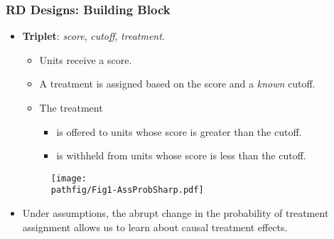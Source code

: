 \documentclass[9pt]{beamer}
\newcommand{\pathfig}{figures}
\begin{document}
\begin{frame}\frametitle{RD Designs: Building Block}
	\begin{itemize}
		\item \textbf{Triplet}: \textit{score}, \textit{cutoff}, \textit{treatment}.\medskip 
		\begin{itemize}
			\item Units receive a score.\medskip 
			
			\item A treatment is assigned based on the score and a \textit{known} cutoff.\medskip
			
			\item The treatment\smallskip
			\begin{itemize}
				\item[] is offered to units whose score is greater than the cutoff.\smallskip 
				\item[] is withheld from units whose score is less than the cutoff.\medskip
			\end{itemize}
		\end{itemize}

	\begin{figure}[h]
		\centering\texttt{[image: \\pathfig/Fig1-AssProbSharp.pdf]}
	\end{figure}

		\item Under assumptions, the abrupt change in the probability of treatment assignment allows us to learn about causal treatment effects.\medskip 
	\end{itemize}
\end{frame}
\end{document}
